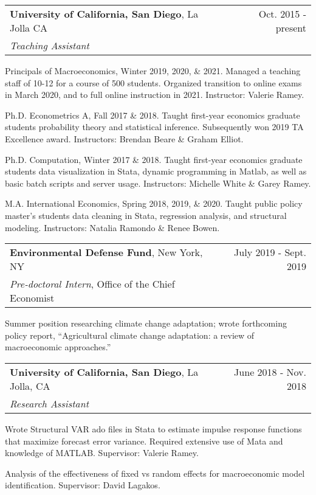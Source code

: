 \documentclass[10pt]{article}
\newcommand{\mysep}{\vspace{4pt}}
\begin{document}
\begin{tabularx}{\textwidth}{LR}
\textbf{University of California, San Diego}, La Jolla CA 
&
Oct. 2015 - present
\\
\emph{Teaching Assistant}
\end{tabularx}
\begin{blist}
\item Principals of Macroeconomics, Winter 2019, 2020, \& 2021. Managed a teaching staff of 10-12 for a course of 500 students. Organized transition to online exams in March 2020, and to full online instruction in 2021. Instructor: Valerie Ramey. 

\item Ph.D. Econometrics A, Fall 2017 \& 2018. Taught first-year economics graduate students probability theory and statistical inference. Subsequently won 2019 TA Excellence award. Instructors: Brendan Beare \& Graham Elliot.

\item Ph.D. Computation, Winter 2017 \& 2018. Taught first-year economics graduate students data visualization in Stata, dynamic programming in Matlab, as well as basic batch scripts and server usage. Instructors: Michelle White \& Garey Ramey.

\item M.A. International Economics, Spring 2018, 2019, \& 2020. Taught public policy master's students data cleaning in Stata, regression analysis, and structural modeling. Instructors: Natalia Ramondo \& Renee Bowen.
\end{blist}

\mysep{}
\begin{tabularx}{\textwidth}{LR}
\textbf{Environmental Defense Fund}, New York, NY 
&
July 2019 - Sept. 2019
\\
\emph{Pre-doctoral Intern}, Office of the Chief Economist
\end{tabularx}
\begin{blist}
\item Summer position researching climate change adaptation; wrote forthcoming policy report, ``Agricultural climate change adaptation: a review of macroeconomic approaches.''
\end{blist}

\mysep{}
\begin{tabularx}{\textwidth}{LR}
\textbf{University of California, San Diego}, La Jolla, CA 
& June 2018 - Nov. 2018
\\
\emph{Research Assistant}
\end{tabularx}
\begin{blist}
\item Wrote Structural VAR ado files in Stata to estimate impulse response functions that maximize forecast error variance. Required extensive use of Mata and knowledge of MATLAB. Supervisor: Valerie Ramey.
\item Analysis of the effectiveness of fixed vs random effects for macroeconomic model identification. Supervisor: David Lagakos.
\end{blist}
\end{document}
